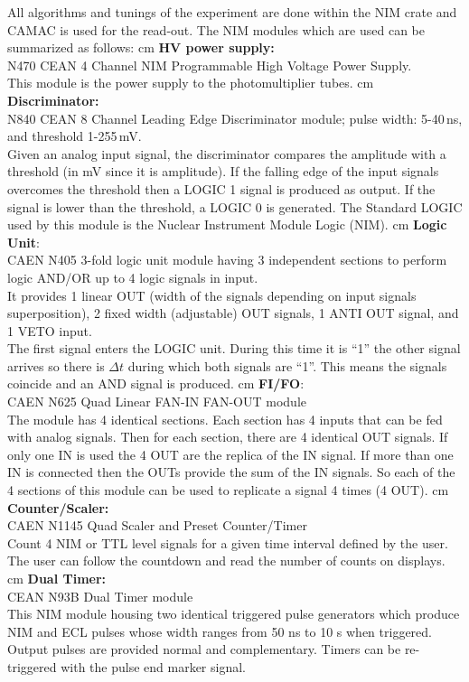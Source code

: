    All algorithms and tunings of the experiment are done within the NIM crate and CAMAC is used
    for the read-out. The NIM modules which are used can be summarized as follows: 
	 cm
	\textbf{HV power supply:}\\ N470 CEAN 4 Channel NIM Programmable High Voltage
    Power Supply.\\
	This module is the power supply to the photomultiplier tubes.
	 cm
	\textbf{Discriminator:}\\ N840 CEAN 8 Channel Leading Edge Discriminator module; pulse width:
    5-40\,ns, and threshold 1-255\,mV.\\
	Given an analog input signal, the discriminator compares the amplitude with a threshold 
    (in mV since it is amplitude). If the falling edge of the input signals overcomes the threshold
    then a LOGIC 1 signal is produced as output. If the signal is lower than the threshold,
    a LOGIC 0 is generated. The Standard LOGIC used by this module is the Nuclear Instrument
    Module Logic (NIM).
	 cm
	\textbf{Logic Unit}:\\ CAEN N405 3-fold logic unit module having 3 independent sections to
    perform logic AND/OR up to 4 logic signals in input.\\
	It provides 1 linear OUT (width of the signals depending on input signals superposition),
    2 ﬁxed width (adjustable) OUT signals, 1 ANTI OUT signal, and 1 VETO input.\\
	The ﬁrst signal enters the LOGIC unit. During this time it is “1” the other signal arrives
    so there is $\Delta t$ during which both signals are “1”. 
    This means the signals coincide and an AND signal is produced.
	 cm
	\textbf{FI/FO}:\\ CAEN N625 Quad Linear FAN-IN FAN-OUT module\\
	The module has 4 identical sections. Each section has 4 inputs that can be fed with analog
    signals. Then for each section, there are 4 identical OUT signals. If only one IN is used the
    4 OUT are the replica of the IN signal. If more than one IN is connected then the OUTs provide
    the sum of the IN signals. So each of the 4 sections of this module can be used to replicate 
    a signal 4 times (4 OUT).
	 cm
	\textbf{Counter/Scaler:}\\ CAEN N1145 Quad Scaler and Preset Counter/Timer\\
	Count 4 NIM or TTL level signals for a given time interval deﬁned by the user.
    The user can follow the countdown and read the number of counts on displays.
    	 cm
	\textbf{Dual Timer:}\\ CEAN N93B Dual Timer module\\
	This NIM module housing two identical triggered pulse generators which produce NIM and ECL pulses whose width ranges from 50 ns to 10 s when 	triggered. Output pulses are provided normal and complementary. Timers can be re-triggered with the pulse end marker signal.
	
